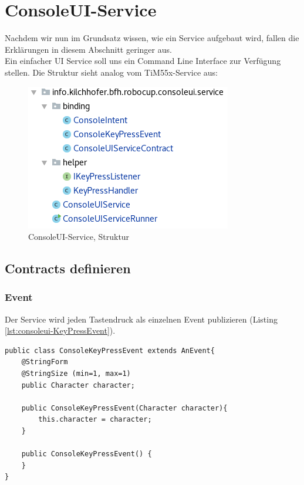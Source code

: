 \section{ConsoleUI-Service}
\label{sec:ConsoleUI-Service}
Nachdem wir nun im Grundsatz wissen, wie ein Service aufgebaut wird, fallen die Erklärungen in diesem Abschnitt geringer aus.\\ Ein einfacher UI Service soll uns ein Command Line Interface zur Verfügung stellen. Die Struktur sieht analog vom TiM55x-Service aus:
\begin{figure}[H]
	\centering
	\includegraphics[scale=0.5]{img/consoleui-java-packagestructure.png}
	\caption{ConsoleUI-Service, Struktur}
	\label{fig:structure_consoleuiservice}
\end{figure}
\subsection{Contracts definieren}
\subsubsection{Event}
Der Service wird jeden Tastendruck als einzelnen Event publizieren (Listing \ref{lst:consoleui-KeyPressEvent}).
\begin{lstlisting}[caption={KeyPressEvent für den ConsoleUI-Service},label={lst:consoleui-KeyPressEvent}]
public class ConsoleKeyPressEvent extends AnEvent{
    @StringForm
    @StringSize (min=1, max=1)
    public Character character;

    public ConsoleKeyPressEvent(Character character){
        this.character = character;
    }

    public ConsoleKeyPressEvent() {
    }
}
\end{lstlisting}
